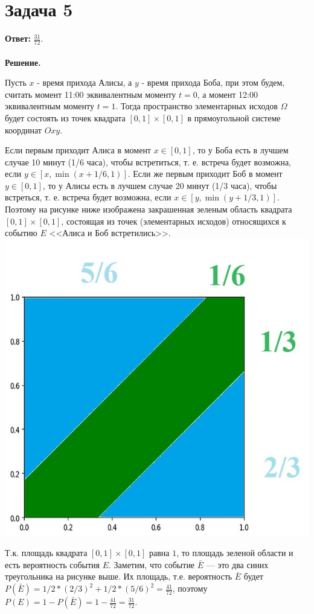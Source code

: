 \documentclass{article}
\begin{document}
\section*{Задача 5}
{\bf Ответ: } $\frac{31}{72}$.
\\
\\
{\bf Решение.} 
\par
Пусть $x$ - время прихода Алисы, а $y$ - время прихода Боба, при этом будем, считать момент 11:00 эквивалентным моменту $t=0$, а момент 12:00 эквивалентным моменту $t=1$. Тогда пространство элементарных исходов $\Omega$ будет состоять из точек квадрата $[0, 1]\times[0, 1]$ в прямоугольной системе координат $Oxy$.
\par
Если первым приходит Алиса в момент $x\in[0, 1]$, то у Боба есть в лучшем случае 10 минут (1/6 часа), чтобы встретиться, т. е. встреча будет возможна, если $y\in [x, \min(x+1/6,1)]$. Если же первым приходит Боб в момент $y\in[0,1]$, то у Алисы есть в лучшем случае 20 минут (1/3 часа), чтобы встреться, т. е. встреча будет возможна, если $x\in [y, \min(y+1/3,1)]$. Поэтому на рисунке ниже изображена закрашенная зеленым область квадрата $[0, 1]\times[0, 1]$, состоящая из точек (элементарных исходов) относящихся к событию $E$ <<Алиса и Боб встретились>>.
\\
{\includegraphics[scale=0.4]{img/img1.jpg}}
\par
Т.к. площадь квадрата $[0, 1]\times[0, 1]$ равна $1$, то площадь зеленой области и есть вероятность события $E$. Заметим, что событие $\bar E$ — это два синих треугольника на рисунке выше. Их площадь, т.е. вероятность $\bar E$ будет $P(\bar E)=1/2*(2/3)^2+1/2*(5/6)^2=\frac{41}{72}$, поэтому $P(E)=1-P(\bar E)=1-\frac{41}{72}=\frac{31}{72}$.
\end{document}
